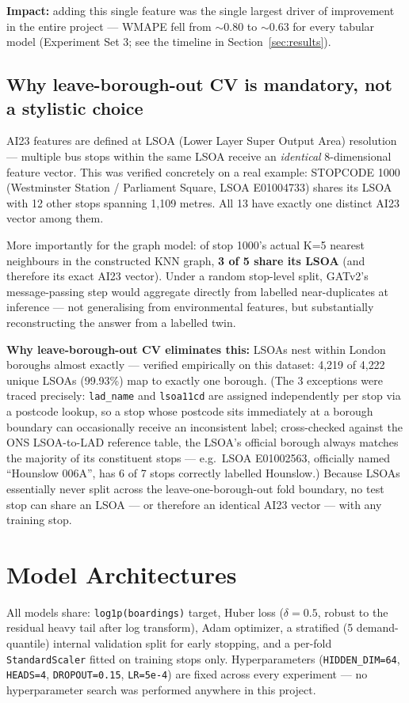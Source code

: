 \documentclass[11pt]{article}
\let\oldsection\section
\renewcommand{\section}[1]{\clearpage\oldsection{\color{sectcolor}#1}}
\let\oldsubsection\subsection
\renewcommand{\subsection}[1]{\oldsubsection{\color{sectcolor}#1}}
\begin{document}
\textbf{Impact:} adding this single feature was the single largest driver of improvement in
the entire project --- WMAPE fell from $\sim$0.80 to $\sim$0.63 for every tabular model
(Experiment Set 3; see the timeline in Section~\ref{sec:results}).

\newpage
\subsection{Why leave-borough-out CV is mandatory, not a stylistic choice}
\label{sec:leakage}
AI23 features are defined at LSOA (Lower Layer Super Output Area) resolution --- multiple
bus stops within the same LSOA receive an \emph{identical} 8-dimensional feature vector.
This was verified concretely on a real example: STOPCODE 1000 (Westminster Station /
Parliament Square, LSOA E01004733) shares its LSOA with 12 other stops spanning 1{,}109
metres. All 13 have exactly one distinct AI23 vector among them.

More importantly for the graph model: of stop 1000's actual K=5 nearest neighbours in the
constructed KNN graph, \textbf{3 of 5 share its LSOA} (and therefore its exact AI23 vector).
Under a random stop-level split, GATv2's message-passing step would aggregate directly from
labelled near-duplicates at inference --- not generalising from environmental features, but
substantially reconstructing the answer from a labelled twin.

\textbf{Why leave-borough-out CV eliminates this:} LSOAs nest within London boroughs almost
exactly --- verified empirically on this dataset: 4{,}219 of 4{,}222 unique LSOAs (99.93\%)
map to exactly one borough. (The 3 exceptions were traced precisely: \texttt{lad\_name} and
\texttt{lsoa11cd} are assigned independently per stop via a postcode lookup, so a stop whose
postcode sits immediately at a borough boundary can occasionally receive an inconsistent
label; cross-checked against the ONS LSOA-to-LAD reference table, the LSOA's official
borough always matches the majority of its constituent stops --- e.g.\ LSOA E01002563,
officially named ``Hounslow 006A'', has 6 of 7 stops correctly labelled Hounslow.) Because
LSOAs essentially never split across the leave-one-borough-out fold boundary, no test stop
can share an LSOA --- or therefore an identical AI23 vector --- with any training stop.

\newpage
\section{Model Architectures}
All models share: \texttt{log1p(boardings)} target, Huber loss ($\delta=0.5$, robust to the
residual heavy tail after log transform), Adam optimizer, a stratified (5 demand-quantile)
internal validation split for early stopping, and a per-fold \texttt{StandardScaler} fitted
on training stops only. Hyperparameters (\texttt{HIDDEN\_DIM=64}, \texttt{HEADS=4},
\texttt{DROPOUT=0.15}, \texttt{LR=5e-4}) are fixed across every experiment --- no
hyperparameter search was performed anywhere in this project.
\end{document}
